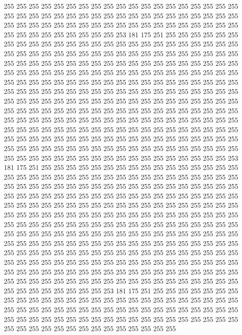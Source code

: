 255 255 255 255 255 255 255 255 255 255 255 255 255 255 255 255 255 255 255 255
255 255 255 255 255 255 255 255 255 255 255 255 255 255 255 255 255 255 255 255
255 255 255 255 255 255 255 255 255 255 255 255 255 255 255 255 255 255 255 255
255 255 255 255 255 255 253 181 175 251 255 255 255 255 255 255 255 255 255 255
255 255 255 255 255 255 255 255 255 255 255 255 255 255 255 255 255 255 255 255
255 255 255 255 255 255 255 255 255 255 255 255 255 255 255 255 255 255 255 255
255 255 255 255 255 255 255 255 255 255 255 255 255 255 255 255 255 255 255 255
255 255 255 255 255 255 255 255 255 255 255 255 255 255 255 255 255 255 255 255
255 255 255 255 255 255 255 255 255 255 255 255 255 255 255 255 255 255 255 255
255 255 255 255 255 255 255 255 255 255 255 255 255 255 255 255 255 255 255 255
255 255 255 255 255 255 255 255 255 255 255 255 255 255 255 255 255 255 255 255
255 255 255 255 255 255 255 255 255 255 255 255 255 255 255 255 255 255 255 255
255 255 255 255 255 255 255 255 255 255 255 255 255 255 255 255 255 255 255 255
255 255 255 255 255 255 255 255 255 255 255 255 255 255 255 255 255 255 255 255
255 255 255 255 255 255 255 255 255 255 255 255 255 255 255 255 255 255 255 255
255 255 255 255 255 255 255 255 255 255 255 255 255 255 255 255 255 255 255 255
255 255 253 181 175 251 255 255 255 255 255 255 255 255 255 255 255 255 255 255
255 255 255 255 255 255 255 255 255 255 255 255 255 255 255 255 255 255 255 255
255 255 255 255 255 255 255 255 255 255 255 255 255 255 255 255 255 255 255 255
255 255 255 255 255 255 255 255 255 255 255 255 255 255 255 255 255 255 255 255
255 255 255 255 255 255 255 255 255 255 255 255 255 255 255 255 255 255 255 255
255 255 255 255 255 255 255 255 255 255 255 255 255 255 255 255 255 255 255 255
255 255 255 255 255 255 255 255 255 255 255 255 255 255 255 255 255 255 255 255
255 255 255 255 255 255 255 255 255 255 255 255 255 255 255 255 255 255 255 255
255 255 255 255 255 255 255 255 255 255 255 255 255 255 255 255 255 255 255 255
255 255 255 255 255 255 255 255 255 255 255 255 255 255 255 255 255 255 255 255
255 255 255 255 255 255 255 255 255 255 255 255 255 255 255 255 255 255 255 255
255 255 255 255 255 255 255 255 255 255 255 255 255 255 255 255 255 255 255 255
255 255 255 255 255 255 255 255 255 255 255 255 255 255 255 255 255 255 253 181
175 251 255 255 255 255 255 255 255 255 255 255 255 255 255 255 255 255 255 255
255 255 255 255 255 255 255 255 255 255 255 255 255 255 255 255 255 255 255 255
255 255 255 255 255 255 255 255 255 255 255 255 255 255 255 255 255 255 255 255
255 255 255 255 255 255 255 255 255 255 255 255 255 255 255 255 255 255 255 255
